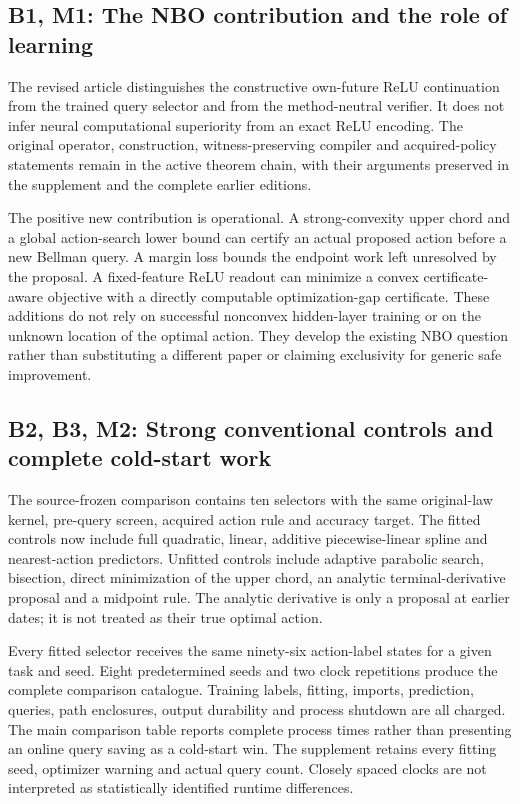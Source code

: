 \hypertarget{b1-m1-the-nbo-contribution-and-the-role-of-learning}{%
\subsection{B1, M1: The NBO contribution and the role of
learning}\label{b1-m1-the-nbo-contribution-and-the-role-of-learning}}

The revised article distinguishes the constructive own-future ReLU
continuation from the trained query selector and from the method-neutral
verifier. It does not infer neural computational superiority from an
exact ReLU encoding. The original operator, construction,
witness-preserving compiler and acquired-policy statements remain in the
active theorem chain, with their arguments preserved in the supplement
and the complete earlier editions.

The positive new contribution is operational. A strong-convexity upper
chord and a global action-search lower bound can certify an actual
proposed action before a new Bellman query. A margin loss bounds the
endpoint work left unresolved by the proposal. A fixed-feature ReLU
readout can minimize a convex certificate-aware objective with a
directly computable optimization-gap certificate. These additions do not
rely on successful nonconvex hidden-layer training or on the unknown
location of the optimal action. They develop the existing NBO question
rather than substituting a different paper or claiming exclusivity for
generic safe improvement.

\hypertarget{b2-b3-m2-strong-conventional-controls-and-complete-cold-start-work}{%
\subsection{B2, B3, M2: Strong conventional controls and complete
cold-start
work}\label{b2-b3-m2-strong-conventional-controls-and-complete-cold-start-work}}

The source-frozen comparison contains ten selectors with the same
original-law kernel, pre-query screen, acquired action rule and accuracy
target. The fitted controls now include full quadratic, linear, additive
piecewise-linear spline and nearest-action predictors. Unfitted controls
include adaptive parabolic search, bisection, direct minimization of the
upper chord, an analytic terminal-derivative proposal and a midpoint
rule. The analytic derivative is only a proposal at earlier dates; it is
not treated as their true optimal action.

Every fitted selector receives the same ninety-six action-label states
for a given task and seed. Eight predetermined seeds and two clock
repetitions produce the complete comparison catalogue. Training labels,
fitting, imports, prediction, queries, path enclosures, output
durability and process shutdown are all charged. The main comparison
table reports complete process times rather than presenting an online
query saving as a cold-start win. The supplement retains every fitting
seed, optimizer warning and actual query count. Closely spaced clocks
are not interpreted as statistically identified runtime differences.

